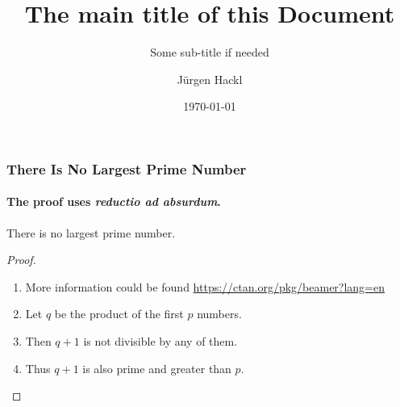 \documentclass[aspectratio=169
]{beamer}
\author{Jürgen Hackl}
\date{\today}
\title{The main title of this Document}
\subtitle{Some sub-title if needed}
\begin{document}
\begin{frame}
  \frametitle{There Is No Largest Prime Number}
  \framesubtitle{The proof uses \textit{reductio ad absurdum}.}
  \begin{theorem}
    There is no largest prime number.
  \end{theorem}
  \begin{proof}
    \begin{enumerate}
    \item<1-| alert@1> More information could be found \url{https://ctan.org/pkg/beamer?lang=en}
    \item<2-> Let $q$ be the product of the first $p$ numbers.
    \item<3-> Then $q+1$ is not divisible by any of them.
    \item<1-> Thus $q+1$ is also prime and greater than $p$.\qedhere
    \end{enumerate}
  \end{proof}
\end{frame}
\end{document}
